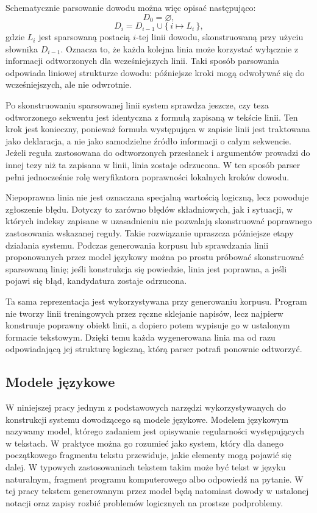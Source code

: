 \documentclass[shortabstract]{iithesis}
\theoremstyle{definition}
\theoremstyle{remark}
\theoremstyle{plain}
\begin{document}
Schematycznie parsowanie dowodu można więc opisać następująco:
\[
D_0 = \varnothing,
\]
\[
D_i = D_{i-1} \cup \{\, i \mapsto L_i \,\},
\]
gdzie \(L_i\) jest sparsowaną postacią \(i\)-tej linii dowodu, skonstruowaną przy
użyciu słownika \(D_{i-1}\). Oznacza to, że każda kolejna linia może korzystać
wyłącznie z informacji odtworzonych dla wcześniejszych linii. Taki sposób parsowania
odpowiada liniowej strukturze dowodu: późniejsze kroki mogą odwoływać się do
wcześniejszych, ale nie odwrotnie.

Po skonstruowaniu sparsowanej linii system sprawdza jeszcze, czy teza odtworzonego
sekwentu jest identyczna z formułą zapisaną w tekście linii. Ten krok jest konieczny,
ponieważ formuła występująca w zapisie linii jest traktowana jako deklaracja, a nie
jako samodzielne źródło informacji o całym sekwencie. Jeżeli reguła zastosowana do
odtworzonych przesłanek i argumentów prowadzi do innej tezy niż ta zapisana w
linii, linia zostaje odrzucona. W ten sposób parser pełni jednocześnie rolę
weryfikatora poprawności lokalnych kroków dowodu.

Niepoprawna linia nie jest oznaczana specjalną wartością logiczną, lecz powoduje
zgłoszenie błędu. Dotyczy to zarówno błędów składniowych, jak i sytuacji, w których
indeksy zapisane w uzasadnieniu nie pozwalają skonstruować poprawnego zastosowania
wskazanej reguły. Takie rozwiązanie upraszcza późniejsze etapy działania systemu.
Podczas generowania korpusu lub sprawdzania linii proponowanych przez model
językowy można po prostu próbować skonstruować sparsowaną linię; jeśli konstrukcja
się powiedzie, linia jest poprawna, a jeśli pojawi się błąd, kandydatura zostaje
odrzucona.

Ta sama reprezentacja jest wykorzystywana przy generowaniu korpusu. Program nie
tworzy linii treningowych przez ręczne sklejanie napisów, lecz najpierw konstruuje
poprawny obiekt linii, a dopiero potem wypisuje go w ustalonym formacie tekstowym.
Dzięki temu każda wygenerowana linia ma od razu odpowiadającą jej strukturę
logiczną, którą parser potrafi ponownie odtworzyć.


\subsection{Modele językowe}

W niniejszej pracy jednym z podstawowych narzędzi wykorzystywanych do konstrukcji
systemu dowodzącego są modele językowe. Modelem językowym nazywamy model, którego
zadaniem jest opisywanie regularności występujących w tekstach. W praktyce można
go rozumieć jako system, który dla danego początkowego fragmentu tekstu przewiduje,
jakie elementy mogą pojawić się dalej. W typowych zastosowaniach tekstem takim
może być tekst w języku naturalnym, fragment programu komputerowego albo odpowiedź
na pytanie. W tej pracy tekstem generowanym przez model będą natomiast dowody w
ustalonej notacji oraz zapisy rozbić problemów logicznych na prostsze podproblemy.
\end{document}
